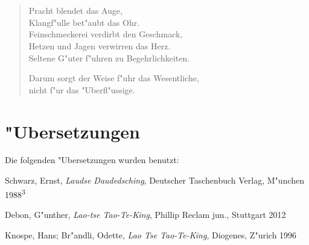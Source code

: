 \documentclass[a4paper,10pt,openany]{book}
\begin{document}
\chapter{}
\begin{verse}
    Pracht blendet das Auge,\\
    Klangf"ulle bet"aubt das Ohr.\\
    Feinschmeckerei verdirbt den Geschmack,\\
    Hetzen und Jagen verwirren das Herz.\\
    Seltene G"uter f"uhren zu Begehrlichkeiten.

    Darum sorgt der Weise f"uhr das Wesentliche,\\
    nicht f"ur das "Uberfl"ussige.
\end{verse}


\appendix
\chapter{"Ubersetzungen}

Die folgenden "Ubersetzungen wurden benutzt:

\begin{description}
\item Schwarz, Ernst, \textit{Laudse Daudedsching}, Deutscher Taschenbuch Verlag, M"unchen 1988\textsuperscript{3}
\item Debon, G"unther, \textit{Lao-tse Tao-Te-King}, Phillip Reclam jun., Stuttgart 2012
\item Knospe, Hans; Br"andli, Odette, \textit{Lao Tse Tao-Te-King}, Diogenes, Z"urich 1996
\end{description}
\end{document}

